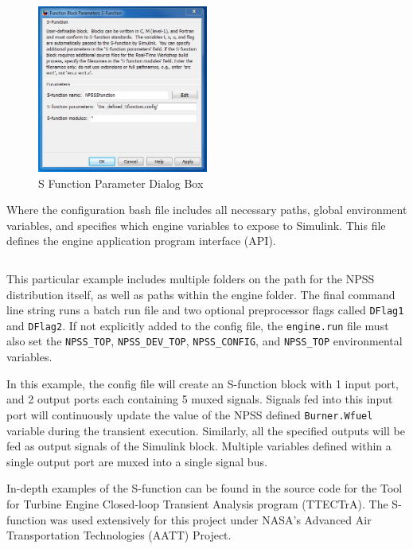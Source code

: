 \documentclass[heading.tex]{subfiles}
\begin{document}
\begin{figure}[H]
\centering
\includegraphics[width=0.5\textwidth]{images/SFuncDialog}
\caption{S Function Parameter Dialog Box}
\label{f:DialogBox}
\end{figure}

Where the configuration bash file includes all necessary paths, global environment variables, and specifies
which engine variables to expose to Simulink. This file defines the engine application program interface (API).

 \begin{adjustwidth}{-1cm}{-1cm}
 \inputminted[]{bash}{code/engineConfig.bat}
 \end{adjustwidth} 

This particular example includes multiple folders on the path for the NPSS distribution itself,
as well as paths within the engine folder.
The final command line string runs a batch run file and two optional preprocessor flags called \texttt{DFlag1}
and \texttt{DFlag2}. If not explicitly added to the config file, the \texttt{engine.run} file must also set
the \texttt{NPSS\_TOP}, \texttt{NPSS\_DEV\_TOP}, \texttt{NPSS\_CONFIG}, and \texttt{NPSS\_TOP} environmental variables.

In this example, the config file will create an S-function block with 1 input port,
and 2 output ports each containing 5 muxed signals.
Signals fed into this input port will continuously update the value of the NPSS defined \texttt{Burner.Wfuel}
variable during the transient execution. Similarly, all the specified outputs will be fed as output
signals of the Simulink block.
Multiple variables defined within a single output port are muxed into a single signal bus.


In-depth examples of the S-function can be found in the source code for the
Tool for Turbine Engine Closed-loop Transient Analysis program (TTECTrA). \cite{TTECTrA}
The S-function was used extensively for this project under
NASA's Advanced Air Transportation Technologies (AATT) Project.
\end{document}
